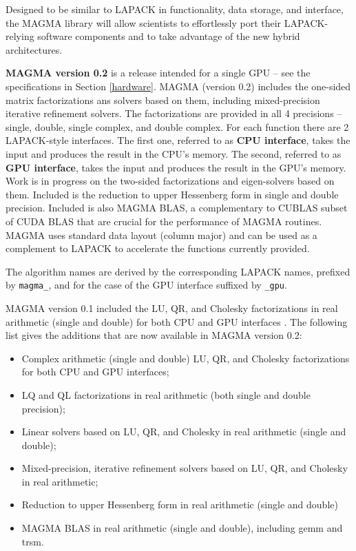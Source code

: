 \documentclass[10pt]{book}
\begin{document}
\vspace{0.1in}
Designed to be similar to LAPACK in functionality, data
storage, and interface, the MAGMA library will allow scientists to effortlessly
port their LAPACK-relying software components and to take advantage of the
new hybrid architectures.

\vspace{0.1in}
{\bf MAGMA version 0.2} is a release intended for a single GPU
 -- see the specifications in Section \ref{hardware}.
MAGMA (version 0.2) includes the one-sided matrix factorizations
ans solvers based on them, including mixed-precision iterative refinement
solvers. The factorizations are provided in all 4 precisions -- single,
double, single complex, and double complex. For each function there
are 2 LAPACK-style interfaces. The first one, referred to as 
{\bf CPU interface}, takes the input and produces the result in the 
CPU's memory. The second, referred to as {\bf GPU interface}, takes the 
input and produces the result in the GPU's memory. Work is in progress
on the two-sided factorizations and eigen-solvers based on them.
Included is the reduction to upper Hessenberg form in single and double
precision. Included is also MAGMA BLAS, a complementary to CUBLAS subset 
of CUDA BLAS that are crucial for the performance of MAGMA routines.
MAGMA uses standard data layout (column major) and can be used as a 
complement to LAPACK to accelerate the functions currently provided.

\vspace{0.1in}
The algorithm names are derived by the corresponding LAPACK names,
prefixed by {\tt magma\_}, and for the case of the GPU interface
suffixed by {\tt \_gpu}.

\vspace{0.1in}
MAGMA version 0.1 included the LU, QR, and Cholesky factorizations
in real arithmetic (single and double) for both CPU and GPU 
interfaces \cite{magma01}.  
The following list gives the additions that are now
available in MAGMA version 0.2:
\begin{itemize}
\item Complex arithmetic (single and double) LU, QR, and Cholesky
      factorizations for both CPU and GPU interfaces; 
\item LQ and QL factorizations in real arithmetic (both single
      and double precision);       
\item Linear solvers based on LU, QR, and Cholesky in
      real arithmetic (single and double); 
\item Mixed-precision, iterative refinement solvers based
      on LU, QR, and Cholesky in real arithmetic;
\item Reduction to upper Hessenberg form in real arithmetic
      (single and double)
\item MAGMA BLAS in real arithmetic (single and double), including 
      gemm and trsm.
\end{itemize}
\end{document}

